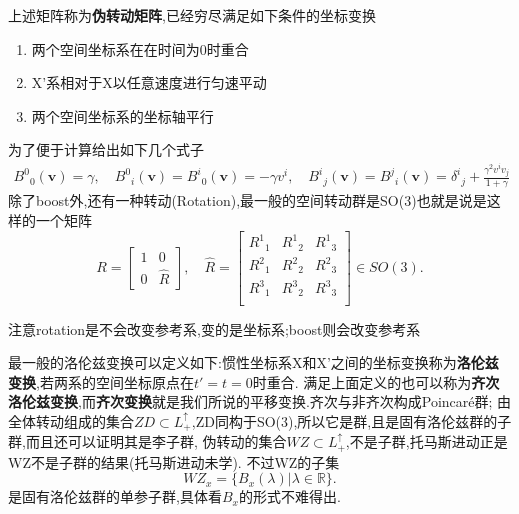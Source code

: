 \documentclass[../main.tex]{subfiles}
\begin{document}
上述矩阵称为\textbf{伪转动矩阵},已经穷尽满足如下条件的坐标变换
\begin{enumerate}
	\item 两个空间坐标系在在时间为0时重合
	\item X'系相对于X以任意速度进行匀速平动
	\item 两个空间坐标系的坐标轴平行
\end{enumerate}
为了便于计算给出如下几个式子
\begin{align}\label{eq:9-1}
	B^{0}{}_0(\bm{v}) = \gamma, \quad B^{0}{}_i(\bm{v})=B^{i}{}_0(\bm{v}) = -\gamma v^i,\quad B^{i}{}_j(\bm{v}) = B^{j}{}_i(\bm{v}) = \delta^{i}{}_j + \frac{\gamma^2 v^i v_j}{1+\gamma}
\end{align}
除了boost外,还有一种转动(Rotation),最一般的空间转动群是SO(3)也就是说是这样的一个矩阵\[
	R =  \begin{bmatrix} 1&0\\ 0 & \hat{R} \end{bmatrix} , \quad \hat{R} = \begin{bmatrix}
		R^1{}_1 & R^1{}_2 & R^1{}_3 \\
		R^2{}_1 & R^2{}_2 & R^2{}_3 \\
		R^3{}_1 & R^3{}_2 & R^3{}_3 \\
	\end{bmatrix} \in SO(3)
	.\]
\begin{note}
	注意rotation是不会改变参考系,变的是坐标系;boost则会改变参考系
\end{note}
最一般的洛伦兹变换可以定义如下:惯性坐标系X和X'之间的坐标变换称为\textbf{洛伦兹变换},若两系的空间坐标原点在$t' = t =0$时重合.
满足上面定义的也可以称为\textbf{齐次洛伦兹变换},而\textbf{齐次变换}就是我们所说的平移变换.齐次与非齐次构成Poincar\'{e}群;
由全体转动组成的集合$ZD \subset L^\uparrow_+$,ZD同构于SO(3),所以它是群,且是固有洛伦兹群的子群,而且还可以证明其是李子群,
伪转动的集合$WZ \subset L^\uparrow_+$,不是子群,托马斯进动正是WZ不是子群的结果(托马斯进动未学).
不过WZ的子集\[
	WZ_x = \{ B_x(\lambda)| \lambda \in \mathbb{R}\}
	.\] 是固有洛伦兹群的单参子群,具体看$B_x$的形式不难得出.
\end{document}
